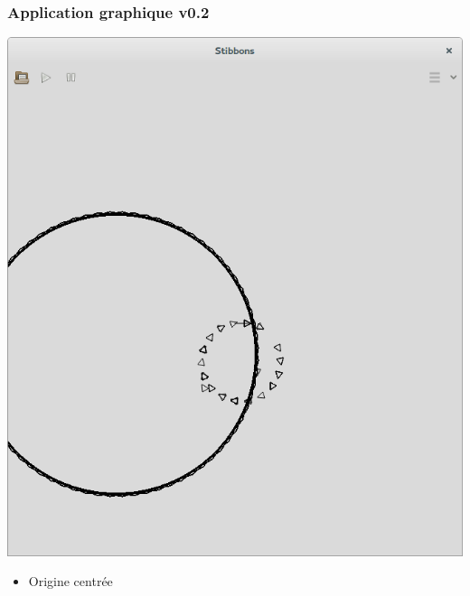 \begin{frame}
\frametitle{Application graphique v0.2}
\begin{center}
\includegraphics[scale=0.16]{doc/Presentation/screenshot/stibbons-0-2-2.png}
\end{center}

\begin{itemize}
	\item Origine centrée
\end{itemize}
\end{frame}

